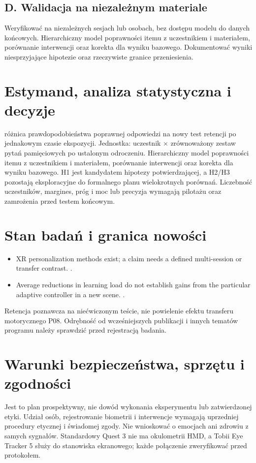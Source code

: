 \documentclass[11pt,a4paper]{article}
\begin{document}
\subsection{D. Walidacja na niezależnym materiale}
Weryfikować na niezależnych sesjach lub osobach, bez dostępu modelu do danych końcowych. Hierarchiczny model poprawności itemu z uczestnikiem i materiałem, porównanie interwencji oraz korekta dla wyniku bazowego. Dokumentować wyniki niesprzyjające hipotezie oraz rzeczywiste granice przeniesienia.
\section{Estymand, analiza statystyczna i decyzje}
różnica prawdopodobieństwa poprawnej odpowiedzi na nowy test retencji po jednakowym czasie ekspozycji. Jednostka: uczestnik × zrównoważony zestaw pytań pamięciowych po ustalonym odroczeniu. Hierarchiczny model poprawności itemu z uczestnikiem i materiałem, porównanie interwencji oraz korekta dla wyniku bazowego. H1 jest kandydatem hipotezy potwierdzającej, a H2/H3 pozostają eksploracyjne do formalnego planu wielokrotnych porównań. Liczebność uczestników, margines, próg i moc lub precyzja wymagają pilotażu oraz zamrożenia przed testem końcowym.
\section{Stan badań i granica nowości}
\begin{itemize}
\item XR personalization methods exist; a claim needs a defined multi-session or transfer contrast. \cite{xrprior1}.
\item Average reductions in learning load do not establish gains from the particular adaptive controller in a new scene. \cite{xrprior2}.
\end{itemize}
Retencja poznawcza na niećwiczonym teście, nie powielenie efektu transferu motorycznego P08. Odrębność od wcześniejszych publikacji i innych tematów programu należy sprawdzić przed rejestracją badania.
\section{Warunki bezpieczeństwa, sprzętu i zgodności}
Jest to plan prospektywny, nie dowód wykonania eksperymentu lub zatwierdzonej etyki. Udział osób, rejestrowanie biometrii i interwencje wymagają uprzedniej procedury etycznej i świadomej zgody. Nie wnioskować o emocjach ani zdrowiu z samych sygnałów. Standardowy Quest 3 nie ma okulometrii HMD, a Tobii Eye Tracker 5 służy do stanowiska ekranowego; każde połączenie zweryfikować przed protokołem.
\end{document}
